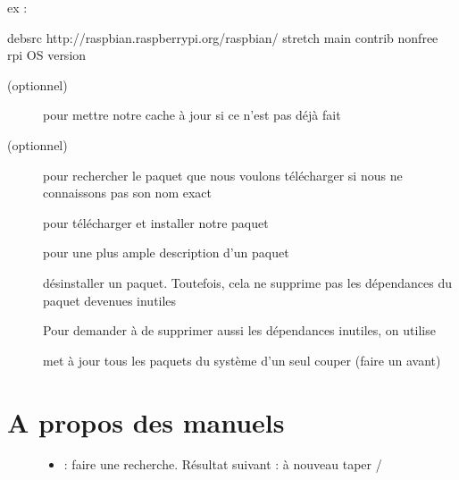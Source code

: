 \documentclass[letterpaper,10pt,french]{sphinxmanual}
\begin{document}
ex :

%
\begin{sphinxVerbatim}[commandchars=\\\{\}]
deb\PYGZhy{}src http://raspbian.raspberrypi.org/raspbian/ stretch main contrib non\PYGZhy{}free rpi
                                                  \PYGZca{} OS version
\end{sphinxVerbatim}
\begin{description}
\item[{ (optionnel)}] \leavevmode
pour mettre notre cache à jour si ce n’est pas déjà fait

\item[{ (optionnel)}] \leavevmode
pour rechercher le paquet que nous voulons télécharger si nous ne connaissons pas son nom exact

\item[{}] \leavevmode
pour télécharger et installer notre paquet

\item[{}] \leavevmode
pour une plus ample description d’un paquet

\item[{}] \leavevmode
désinstaller un paquet. Toutefois, cela ne supprime pas les dépendances du paquet devenues inutiles

\item[{}] \leavevmode
Pour demander à  de supprimer aussi les dépendances inutiles, on utilise 

\item[{}] \leavevmode
met à jour tous les paquets du système d’un seul couper (faire un  avant)

\end{description}


\chapter{A propos des manuels}
\label{\detokenize{13-man:a-propos-des-manuels}}\label{\detokenize{13-man::doc}}\begin{description}
\item[{}] \leavevmode\begin{itemize}
\item {} 
 : faire une recherche. Résultat suivant : à nouveau taper /

\end{itemize}

\end{description}
\end{document}
